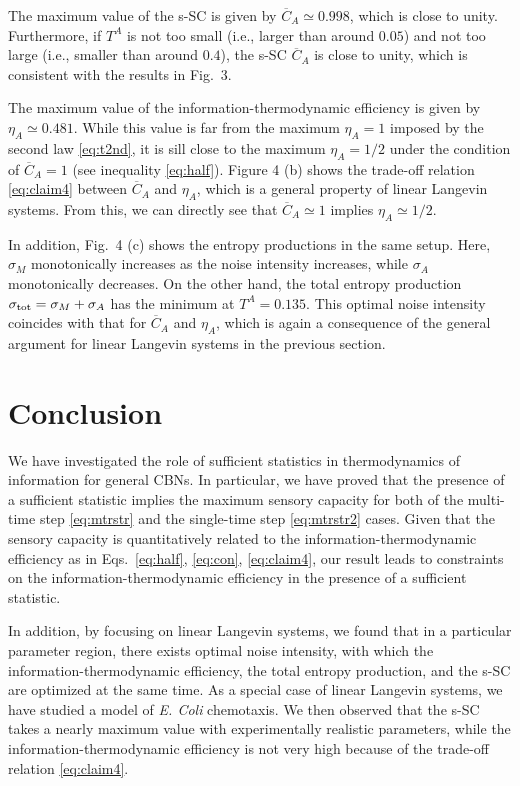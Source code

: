 \documentclass[%
 reprint,
 amsmath,amssymb,
 aps,
]{revtex4-1}
\theoremstyle{plain}
\begin{document}
The maximum value of the s-SC is given by $\overline{C}_A \simeq 0.998$, which is close to unity.
Furthermore, if $T^A$ is not too small (i.e., larger than around $0.05$) and not too large (i.e.,  smaller than around $0.4$), the s-SC $\overline{C}_A$ is close to unity, which is consistent with the results in Fig.~3. 

The maximum value of the information-thermodynamic efficiency is given by $\eta_A \simeq 0.481$.  While this value is far from the maximum $\eta_A =1$ imposed by the second law \eqref{eq:t2nd}, it is sill close to the maximum $\eta_A = 1/2$ under the condition of $\overline{C}_A=1$ (see inequality \eqref{eq:half}). Figure 4 (b) shows the trade-off relation \eqref{eq:claim4} between $\overline{C}_A$ and $\eta_A$, which is a general property of linear Langevin systems.  
From this, we can directly see that $\overline{C}_A \simeq 1$ implies $\eta_A \simeq 1/2$.

In addition, Fig.~4 (c) shows the entropy productions in the same setup. Here, $\sigma_M$ monotonically increases as the noise intensity increases, while $\sigma_A$ monotonically decreases. On the other hand, the total entropy production $\sigma_{\rm tot}=\sigma_M+\sigma_A$ has the minimum at $T^A = 0.135$. This optimal noise intensity coincides with that for $\overline{C}_A$ and $\eta_A$, which is again a consequence of the general argument for linear Langevin systems in the previous section.

\section{Conclusion}\label{sec:conc}
We have investigated the role of sufficient statistics in thermodynamics of information for general CBNs. In particular, we have proved that the presence of a sufficient statistic implies the maximum sensory capacity for both of the multi-time step \eqref{eq:mtrstr} and the single-time step \eqref{eq:mtrstr2} cases.  Given that the sensory capacity is quantitatively related to the information-thermodynamic efficiency as in Eqs.~\eqref{eq:half}, \eqref{eq:con}, \eqref{eq:claim4}, our result leads to constraints on the information-thermodynamic efficiency in the presence of a sufficient statistic.  

In addition, by focusing on linear Langevin systems, we found that in a particular parameter region, there exists optimal noise intensity, with which the information-thermodynamic efficiency, the total entropy production, and the s-SC are optimized at the same time.  As a special case of linear Langevin systems, we have studied a model of {\it E. Coli} chemotaxis.  We then observed that the s-SC takes a nearly maximum value with experimentally realistic parameters, while the information-thermodynamic efficiency is not very high because of the trade-off relation \eqref{eq:claim4}.  
\end{document}
